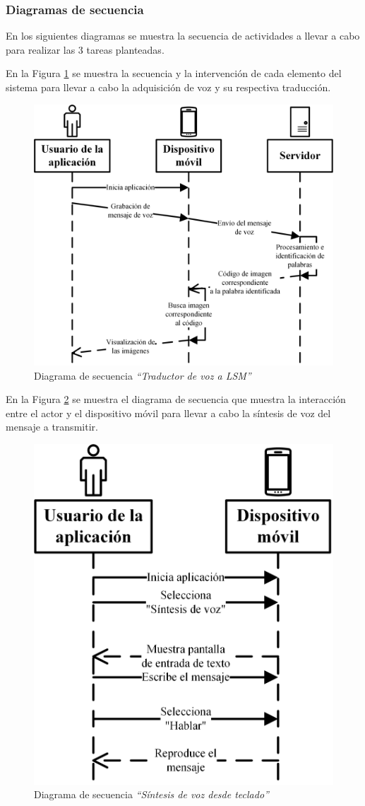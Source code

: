 \subsubsection{Diagramas de secuencia}

En los siguientes diagramas se muestra la secuencia de actividades a llevar a cabo para realizar las 3 tareas planteadas.

En la Figura \ref{fig:secVoz} se muestra la secuencia y la intervención de cada elemento del sistema para llevar a cabo la adquisición de voz y su respectiva traducción.

		\begin{figure}[H]
			\centering
			\includegraphics[width=0.7\linewidth]{figures/secuenciaVoz}
			\caption{Diagrama de secuencia \textit{``Traductor de voz a LSM''}}
			\label{fig:secVoz}
		\end{figure}
		
En la Figura \ref{fig:secSintesis} se muestra el diagrama de secuencia que muestra la interacción entre el actor y el dispositivo móvil para llevar a cabo la síntesis de voz del mensaje a transmitir.

		\begin{figure}[H]
			\centering
			\includegraphics[width=0.5\linewidth]{figures/secuenciaSintesis}
			\caption{Diagrama de secuencia \textit{``Síntesis de voz desde teclado''}}
			\label{fig:secSintesis}
		\end{figure}		
		
